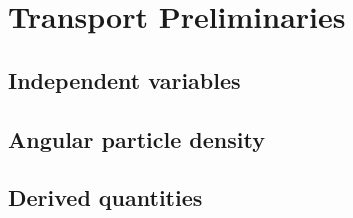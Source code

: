 \section{Transport Preliminaries}

\subsection{Independent variables}

\subsection{Angular particle density}

\subsection{Derived quantities}